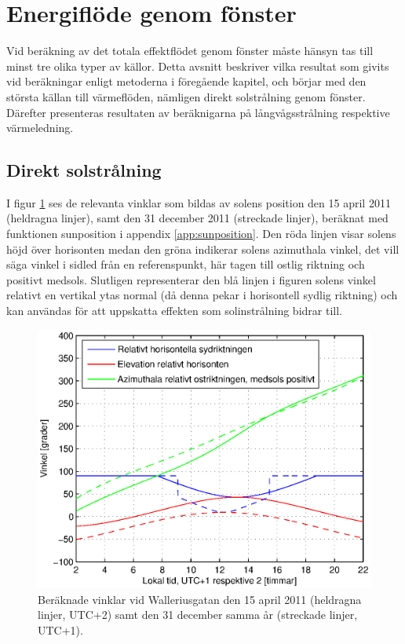 \section{Energiflöde genom fönster}

Vid beräkning av det totala effektflödet genom fönster måste hänsyn tas till minst tre olika typer av källor. Detta avsnitt beskriver vilka resultat som givits vid beräkningar enligt metoderna i föregående kapitel, och börjar med den största källan till värmeflöden, nämligen direkt solstrålning genom fönster. Därefter presenteras resultaten av beräknigarna på långvågsstrålning respektive värmeledning.

\subsection{Direkt solstrålning}
I figur \ref{fig:sun0415and1231} ses de relevanta vinklar som bildas av solens position den 15 april 2011 (heldragna linjer), samt den 31 december 2011 (streckade linjer), beräknat med funktionen sunposition i appendix \ref{app:sunposition}. Den röda linjen visar solens höjd över horisonten medan den gröna indikerar solens azimuthala vinkel, det vill säga vinkel i sidled från en referenspunkt, här tagen till ostlig riktning och positivt medsols. Slutligen representerar den blå linjen i figuren solens vinkel relativt en vertikal ytas normal (då denna pekar i horisontell sydlig riktning) och kan användas för att uppskatta effekten som solinstrålning bidrar till.

\begin{figure}[hpbt]
\centering
\includegraphics[scale=0.7]{images/sun0415and1231.eps}
\caption{\label{fig:sun0415and1231} Beräknade vinklar vid Walleriusgatan den 15 april 2011 (heldragna linjer, UTC+2) samt den 31 december samma år (streckade linjer, UTC+1).}
\end{figure}

